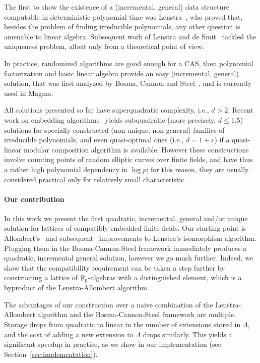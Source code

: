 \documentclass{sig-alternate}
\begin{document}
The first to show the existence of a (incremental, general) data
structure computable in deterministic polynomial time was
Lenstra~\cite{LenstraJr91}, who proved that, besides the problem of
finding irreducible polynomials, any other question is amenable to
linear algebra. %
Subsequent work of Lenstra and de
Smit~\cite{lenstra+desmit08-stdmodels} tackled the uniqueness problem,
albeit only from a theoretical point of view. %

In practice, randomized algorithms are good enough for a CAS, then
polynomial factorization and basic linear algebra provide an easy
(incremental, general) solution, that was first analyzed by Bosma,
Cannon and Steel~\cite{bosma+cannon+steel97}, and is currently used in
Magma. %

All solutions presented so far have superquadratic complexity, i.e.,
$d>2$. %
Recent work on embedding algorithms~\cite{DoSc12,DeDoSc13,DeDoSc2014}
yields subquadratic (more precisely, $d\le 1.5$) solutions for
specially constructed (non-unique, non-general) families of
irreducible polynomials, and even quasi-optimal ones (i.e.,
$d=1+\varepsilon$) if a quasi-linear modular composition algorithm is
available. %
However these constructions involve counting points of random elliptic
curves over finite fields, and have thus a rather high polynomial
dependency in $\log p$; for this reason, they are usually considered
practical only for relatively small characteristic.


\paragraph{Our contribution}
In this work we present the first
quadratic, %
incremental, general and/or unique %
solution for lattices of compatibly embedded finite fields. %
Our starting point is Allombert's~\cite{Allombert02} and
subsequent~\cite{brieulle2018computing} improvements to Lenstra's
isomorphism algorithm. %
Plugging them in the Bosma-Cannon-Steel framework immediately produces
a quadratic, incremental general solution, however we go much
further. %
Indeed, we show that the compatibility requirement can be taken a step
further by constructing a lattice of $\mathbb{F}_{p}$-algebras with a
distinguished element, which is a byproduct of the Lenstra-Allombert
algorithm.

The advantages of our construction over a naive combination of the
Lenstra-Allombert algorithm and the Bosma-Cannon-Steel framework are
multiple. %
Storage drops from quadratic to linear in the number of extensions
stored in $\Lambda$, and the cost of adding a new extension to
$\Lambda$ drops similarly. %
This yields a significant speedup in practice, as we show in our
implementation (see Section~\ref{sec:implementation}).
\end{document}
